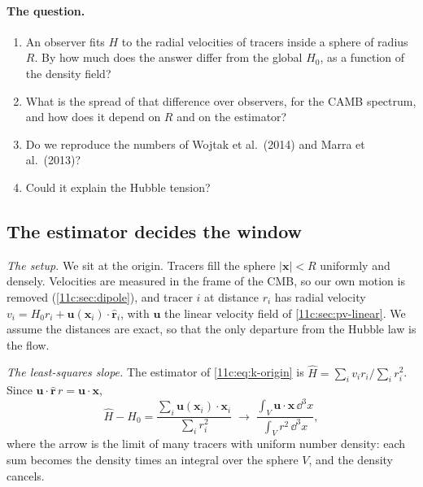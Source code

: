 \paragraph{The question.}
\begin{enumerate}
  \item An observer fits $H$ to the radial velocities of tracers inside a sphere of
        radius $R$. By how much does the answer differ from the global $H_0$, as a
        function of the density field?
  \item What is the spread of that difference over observers, for the CAMB
        spectrum, and how does it depend on $R$ and on the estimator?
  \item Do we reproduce the numbers of Wojtak et al.\ (2014) and Marra et al.\ (2013)?
  \item Could it explain the Hubble tension?
\end{enumerate}

\subsection{The estimator decides the window}
\label{11c:sec:window}

\emph{The setup.} We sit at the origin. Tracers fill the sphere $|\bm x|<R$
uniformly and densely. Velocities are measured in the frame of the CMB, so our own
motion is removed (\cref{11c:sec:dipole}), and tracer $i$ at distance $r_i$ has radial
velocity $v_i=H_0r_i+\bm u(\bm x_i)\cdot\hat{\bm r}_i$, with $\bm u$ the linear velocity
field of \cref{11c:sec:pv-linear}. We assume the distances are exact, so that the only
departure from the Hubble law is the flow.

\emph{The least-squares slope.} The estimator of \eqref{11c:eq:k-origin} is
$\hat H=\sum_iv_ir_i/\sum_ir_i^2$. Since $\bm u\cdot\hat{\bm r}\,r=\bm u\cdot\bm x$,
\[
  \hat H-H_0=\frac{\sum_i\bm u(\bm x_i)\cdot\bm x_i}{\sum_ir_i^2}
  \;\longrightarrow\;
  \frac{\int_V\bm u\cdot\bm x\,\dd^3x}{\int_Vr^2\,\dd^3x},
\]
where the arrow is the limit of many tracers with uniform number density: each sum
becomes the density times an integral over the sphere $V$, and the density cancels.

